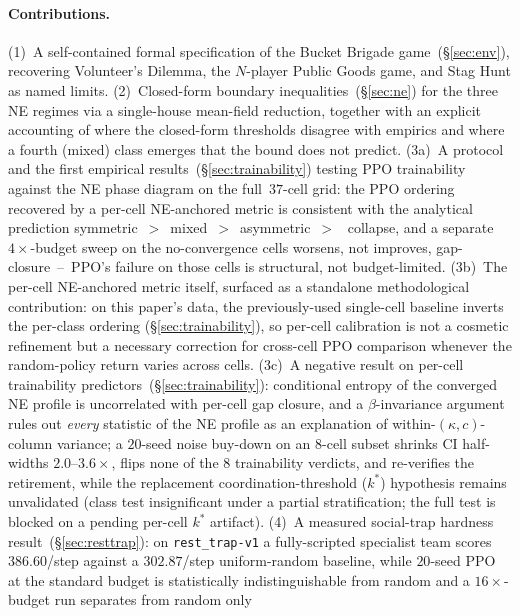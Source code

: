 \documentclass{anvil-paper}
\begin{document}
\paragraph{Contributions.} (1)~A self-contained formal specification of the
Bucket Brigade game~(\S\ref{sec:env}), recovering Volunteer's Dilemma, the
$N$-player Public Goods game, and Stag Hunt as named limits.
(2)~Closed-form boundary inequalities~(\S\ref{sec:ne}) for the three NE
regimes via a single-house mean-field reduction, together with an explicit
accounting of where the closed-form thresholds disagree with empirics and
where a fourth (\textsf{mixed}) class emerges that the bound does not
predict. (3a)~A protocol and the first empirical
results~(\S\ref{sec:trainability}) testing PPO trainability against the
NE phase diagram on the full~$37$-cell grid: the PPO ordering recovered
by a per-cell NE-anchored metric is consistent with the analytical
prediction
\textsf{symmetric}~$>$~\textsf{mixed}~$>$~\textsf{asymmetric}~$>$~%
\textsf{collapse}, and a separate~$4{\times}$-budget sweep on the
no-convergence cells worsens, not improves, gap-closure~--~PPO's
failure on those cells is structural, not budget-limited.
(3b)~The per-cell NE-anchored metric itself, surfaced as a standalone
methodological contribution: on this paper's data, the previously-used
single-cell baseline inverts the per-class ordering (\S\ref{sec:trainability}),
so per-cell calibration is not a cosmetic refinement but a necessary
correction for cross-cell PPO comparison whenever the random-policy
return varies across cells.
(3c)~A negative result on per-cell trainability
predictors~(\S\ref{sec:trainability}): conditional entropy of the
converged NE profile is uncorrelated with per-cell gap closure, and a
$\beta$-invariance argument rules out \emph{every} statistic of the NE
profile as an explanation of within-$(\kappa,c)$-column variance; a
$20$-seed noise buy-down on an $8$-cell subset shrinks CI half-widths
$2.0$--$3.6{\times}$, flips none of the $8$ trainability verdicts, and
re-verifies the retirement, while the replacement
coordination-threshold ($k^{*}$) hypothesis remains unvalidated (class
test insignificant under a partial stratification; the full test is
blocked on a pending per-cell $k^{*}$ artifact).
(4)~A measured social-trap hardness result~(\S\ref{sec:resttrap}): on
\texttt{rest\_trap-v1} a fully-scripted specialist team scores
$386.60$/step against a $302.87$/step uniform-random baseline, while
$20$-seed PPO at the standard budget is statistically indistinguishable
from random and a $16{\times}$-budget run separates from random only
\end{document}
